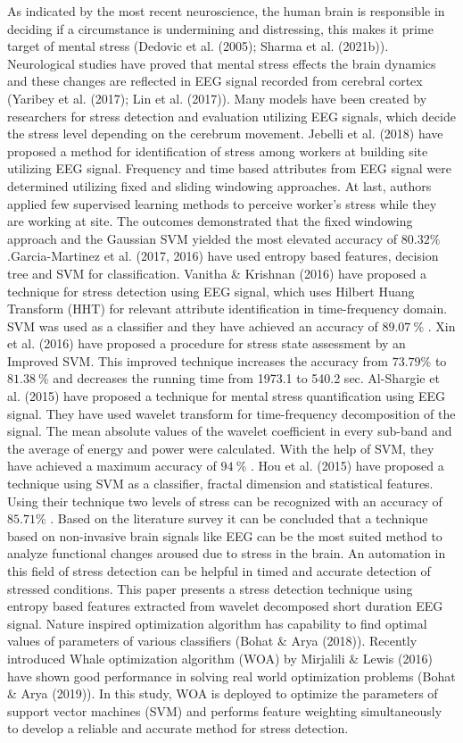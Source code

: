 As indicated by the most recent neuroscience, the human brain is responsible in deciding if a circumstance is undermining and distressing, this makes it prime target of mental stress (Dedovic et al. (2005); Sharma et al. (2021b)). Neurological studies have proved that mental stress effects the brain dynamics and these changes are reflected in EEG signal recorded from cerebral cortex (Yaribey et al. (2017); Lin et al. (2017)). Many models have been created by researchers for stress detection and evaluation utilizing EEG signals, which decide the stress level depending on the cerebrum movement. Jebelli et al. (2018) have proposed a method for identification of stress among workers at building site utilizing EEG signal. Frequency and time based attributes from EEG signal were determined utilizing fixed and sliding windowing approaches. At last, authors applied few supervised learning methods to perceive worker’s stress while they are working at site. The outcomes demonstrated that the fixed windowing approach and the Gaussian SVM yielded the most elevated accuracy of $80.32\%$ .Garcia-Martinez et al. (2017, 2016) have used entropy based features, decision tree and SVM for classification. Vanitha \& Krishnan (2016) have proposed a technique for stress detection using EEG signal, which uses Hilbert Huang Transform (HHT) for relevant attribute identification in time-frequency domain. SVM was used as a classifier and they have achieved an accuracy of $89.07~\%$ . Xin et al. (2016) have proposed a procedure for stress state assessment by an Improved SVM. This improved technique increases the accuracy from $73.79\%$ to $81.38~\%$ and decreases the running time from 1973.1 to 540.2 sec. Al-Shargie et al. (2015) have proposed a technique for mental stress quantification using EEG signal. They have used wavelet transform for time-frequency decomposition of the signal. The mean absolute values of the wavelet coefficient in every sub-band and the average of energy and power were calculated. With the help of SVM, they have achieved a maximum accuracy of $94~\%$ . Hou et al. (2015) have proposed a technique using SVM as a classifier, fractal dimension and statistical features. Using their technique two levels of stress can be recognized with an accuracy of $85.71\%$ . Based on the literature survey it can be concluded that a technique based on non-invasive brain signals like EEG can be the most suited method to analyze functional changes aroused due to stress in the brain. An automation in this field of stress detection can be helpful in timed and accurate detection of stressed conditions. This paper presents a stress detection technique using entropy based features extracted from wavelet decomposed short duration EEG signal. Nature inspired optimization algorithm has capability to find optimal values of parameters of various classifiers (Bohat $\&$ Arya (2018)). Recently introduced Whale optimization algorithm (WOA) by Mirjalili $\&$ Lewis (2016) have shown good performance in solving real world optimization problems (Bohat \& Arya (2019)). In this study, WOA is deployed to optimize the parameters of support vector machines (SVM) and performs feature weighting simultaneously to develop a reliable and accurate method for stress detection.

